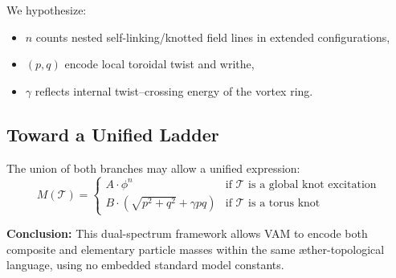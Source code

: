 We hypothesize:
\begin{itemize}
  \item $n$ counts nested self-linking/knotted field lines in extended configurations,
  \item $(p,q)$ encode local toroidal twist and writhe,
  \item $\gamma$ reflects internal twist–crossing energy of the vortex ring.
\end{itemize}

\subsection{Toward a Unified Ladder}

The union of both branches may allow a unified expression:
\[
M(\mathcal{T}) =
\begin{cases}
A \cdot \phi^n & \text{if } \mathcal{T} \text{ is a global knot excitation} \\
B \cdot \left( \sqrt{p^2 + q^2} + \gamma pq \right) & \text{if } \mathcal{T} \text{ is a torus knot}
\end{cases}
\]

\textbf{Conclusion:} This dual-spectrum framework allows VAM to encode both composite and elementary particle masses within the same æther-topological language, using no embedded standard model constants.

